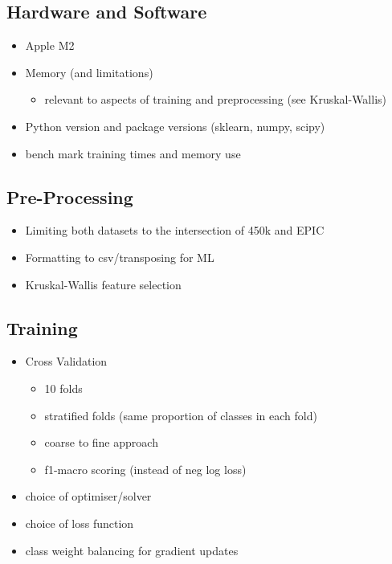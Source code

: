 \documentclass{article}
\begin{document}
\subsection{Hardware and Software}
\begin{itemize}
    \item Apple M2
    \item Memory (and limitations)
    \begin{itemize}
        \item relevant to aspects of training and preprocessing (see Kruskal-Wallis)
    \end{itemize}
    \item Python version and package versions (sklearn, numpy, scipy)
    \item bench mark training times and memory use
\end{itemize}

\subsection{Pre-Processing}
\begin{itemize}
    \item Limiting both datasets to the intersection of 450k and EPIC
    \item Formatting to csv/transposing for ML
    \item Kruskal-Wallis feature selection
\end{itemize}

\subsection{Training}
\begin{itemize}
    \item Cross Validation
    \begin{itemize}
        \item 10 folds
        \item stratified folds (same proportion of classes in each fold)
        \item coarse to fine approach
        \item f1-macro scoring (instead of neg log loss)
    \end{itemize}
    \item choice of optimiser/solver
    \item choice of loss function
    \item class weight balancing for gradient updates

\end{itemize}
\end{document}
